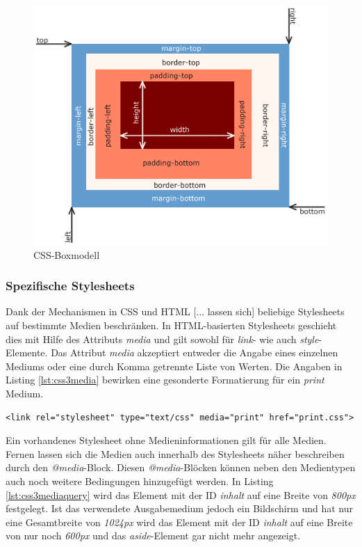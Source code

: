 \begin{figure}[htb]
  \centering
  \includegraphics[width=0.8\linewidth]{abb/css_boxmodell}
  \caption[CSS-Boxmodell]{CSS-Boxmodell\footnotemark}
  \label{fig:cssboxmodell}
\end{figure}
	
\subsubsection{Spezifische Stylesheets} \glqq Dank der Mechanismen in CSS und HTML [... lassen sich] beliebige Stylesheets auf bestimmte Medien beschränken. In HTML-basierten Stylesheets geschieht dies mit Hilfe des Attributs \textit{media} und gilt sowohl für \textit{link}- wie auch \textit{style}-Elemente. Das Attribut \textit{media} akzeptiert entweder die Angabe eines einzelnen Mediums oder eine durch Komma getrennte Liste von Werten.\grqq{}\cite[S.434ff]{MeyeCasc2005} Die Angaben in Listing \ref{lst:css3media} bewirken eine gesonderte Formatierung für ein \textit{print} Medium.

	\vspace{1em}
	\begin{lstlisting}[frame=htrbl, caption=CSS3 medienspezifisches Stylesheet, label=lst:css3media]
<link rel="stylesheet" type="text/css" media="print" href="print.css">
	\end{lstlisting}
	
Ein vorhandenes Stylesheet ohne Medieninformationen gilt für alle Medien. Fernen lassen sich die Medien auch innerhalb des Stylesheets näher beschreiben durch den \textit{@media}-Block. Diesen \textit{@media}-Blöcken können neben den Medientypen auch noch weitere Bedingungen hinzugefügt werden. In Listing \ref{lst:css3mediaquery} wird das Element mit der ID \textit{inhalt} auf eine Breite von \textit{800px} festgelegt. Ist das verwendete Ausgabemedium jedoch ein Bildschirm und hat nur eine Gesamtbreite von \textit{1024px} wird das Element mit der ID \textit{inhalt} auf eine Breite von nur noch \textit{600px} und das \textit{aside}-Element gar nicht mehr angezeigt.


